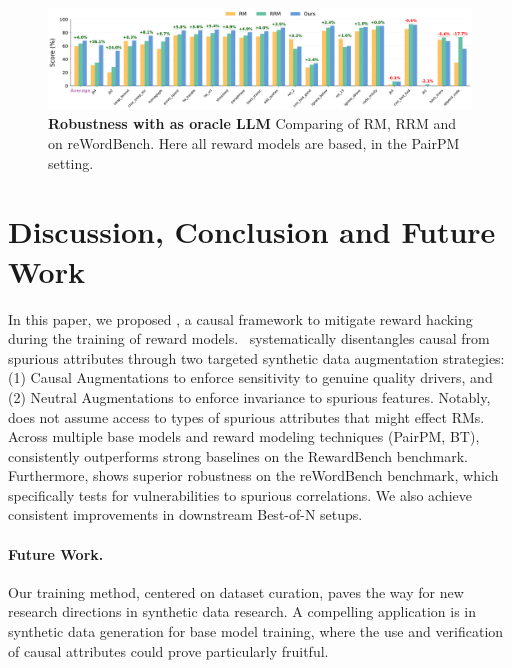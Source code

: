 \begin{figure}[!h]
  \centering
  \includegraphics[width=1.0\columnwidth]{images/reword_absolute_robustness_qgemma9b_pairpm_Gemma27b_oracle_sorted.pdf}
  \caption{\textbf{Robustness with  as oracle LLM} Comparing of RM, RRM and \carma{} on reWordBench. Here all reward models are  based, in the PairPM setting.\vspace{-0.1in}
  }
  \label{fig:reword_absolute_robustness_gemma9b_pairpm_gemma27Boracle_main}
\end{figure}

\vspace{-0.1in}
\section{Discussion, Conclusion and Future Work}

\vspace{-0.1in}
In this paper, we proposed \carma, a causal framework to mitigate reward hacking during the training of reward models. \carma\ systematically disentangles causal from spurious attributes through two targeted synthetic data augmentation strategies: (1) Causal Augmentations to enforce sensitivity to genuine quality drivers, and (2) Neutral Augmentations to enforce invariance to spurious features. Notably, \carma{} does not assume access to types of spurious attributes that might effect RMs. 
Across multiple base models and reward modeling techniques (PairPM, BT), \carma{} consistently outperforms strong baselines on the RewardBench benchmark. Furthermore, \carma{} shows superior robustness on the reWordBench benchmark, which specifically tests for vulnerabilities to spurious correlations. 
We also achieve consistent improvements in downstream Best-of-N setups. 

\vspace{-0.12in}
\paragraph{Future Work.}
Our training method, centered on dataset curation, paves the way for new research directions in synthetic data research. 
A compelling application is in synthetic data generation for base model training, where the use and verification of causal attributes could prove particularly fruitful.